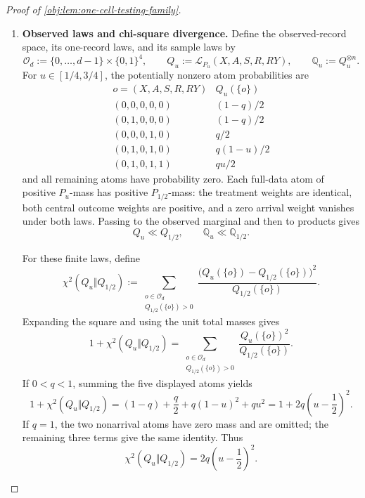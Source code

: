 \documentclass[11pt]{article}
\begin{document}
\begin{proof}[Proof of \cref{obj:lem:one-cell-testing-family}]
\begin{enumerate}
\item \textbf{Observed laws and chi-square divergence.}
Define the observed-record space, its one-record laws, and its sample laws by
\[
\mathcal O_d:=\{0,\ldots,d-1\}\times\{0,1\}^4,
\qquad
Q_u:=\mathcal L_{P_u}(X,A,S,R,RY),
\qquad
\mathbb Q_u:=Q_u^{\otimes n}.
\]
For \(u\in[1/4,3/4]\), the potentially nonzero atom probabilities are
\[
\begin{array}{c|c}
o=(X,A,S,R,RY)&Q_u(\{o\})\\ \hline
(0,0,0,0,0)&(1-q)/2\\
(0,1,0,0,0)&(1-q)/2\\
(0,0,0,1,0)&q/2\\
(0,1,0,1,0)&q(1-u)/2\\
(0,1,0,1,1)&qu/2
\end{array}
\]
and all remaining atoms have probability zero. Each full-data atom of positive \(P_u\)-mass has positive \(P_{1/2}\)-mass: the treatment weights are identical, both central outcome weights are positive, and a zero arrival weight vanishes under both laws. Passing to the observed marginal and then to products gives
\[
Q_u\ll Q_{1/2},
\qquad
\mathbb Q_u\ll\mathbb Q_{1/2}.
\]

For these finite laws, define
\[
\chi^2(Q_u\Vert Q_{1/2})
:=
\sum_{\substack{o\in\mathcal O_d\\Q_{1/2}(\{o\})>0}}
\frac{\bigl(Q_u(\{o\})-Q_{1/2}(\{o\})\bigr)^2}
     {Q_{1/2}(\{o\})}.
\]
Expanding the square and using the unit total masses gives
\[
1+\chi^2(Q_u\Vert Q_{1/2})
=
\sum_{\substack{o\in\mathcal O_d\\Q_{1/2}(\{o\})>0}}
\frac{Q_u(\{o\})^2}{Q_{1/2}(\{o\})}.
\]
If \(0<q<1\), summing the five displayed atoms yields
\[
1+\chi^2(Q_u\Vert Q_{1/2})
=
(1-q)+\frac q2+q(1-u)^2+qu^2
=
1+2q\left(u-\frac12\right)^2.
\]
If \(q=1\), the two nonarrival atoms have zero mass and are omitted; the remaining three terms give the same identity. Thus
\[
\chi^2(Q_u\Vert Q_{1/2})
=
2q\left(u-\frac12\right)^2.
\]


\end{enumerate}
\end{proof}
\end{document}
